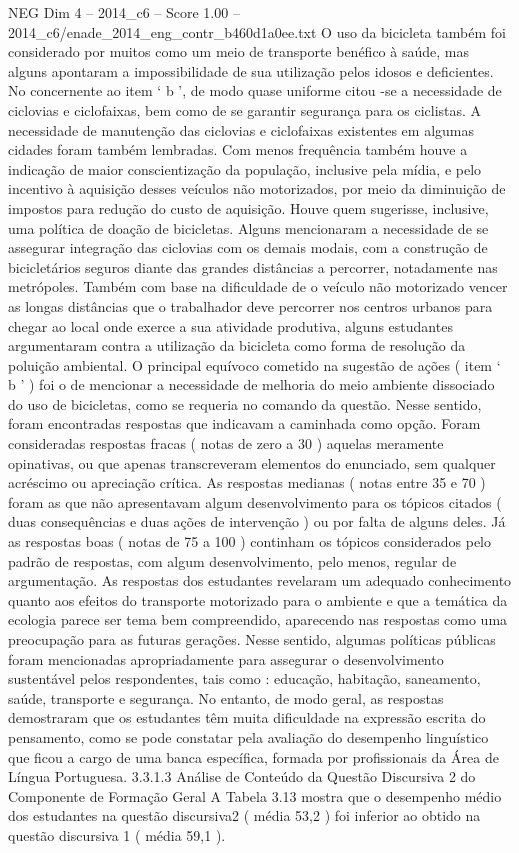 \begin{textsample}{NEG Dim 4 – 2014\_c6 – Score 1.00 – 2014\_c6/enade\_2014\_eng\_contr\_b460d1a0ee.txt}
O uso da bicicleta também foi considerado por muitos como um meio de transporte benéfico à saúde, mas alguns apontaram a impossibilidade de sua utilização pelos idosos e deficientes.
No concernente ao item ‘ b ’, de modo quase uniforme citou -se a necessidade de ciclovias e ciclofaixas, bem como de se garantir segurança para os ciclistas.
A necessidade de manutenção das ciclovias e ciclofaixas existentes em algumas cidades foram também lembradas.
Com menos frequência também houve a indicação de maior conscientização da população, inclusive pela mídia, e pelo incentivo à aquisição desses veículos não motorizados, por meio da diminuição de impostos para redução do custo de aquisição.
Houve quem sugerisse, inclusive, uma política de doação de bicicletas.
Alguns mencionaram a necessidade de se assegurar integração das ciclovias com os demais modais, com a construção de bicicletários seguros diante das grandes distâncias a percorrer, notadamente nas metrópoles.
Também com base na dificuldade de o veículo não motorizado vencer as longas distâncias que o trabalhador deve percorrer nos centros urbanos para chegar ao local onde exerce a sua atividade produtiva, alguns estudantes argumentaram contra a utilização da bicicleta como forma de resolução da poluição ambiental.
O principal equívoco cometido na sugestão de ações ( item ‘ b ’ ) foi o de mencionar a necessidade de melhoria do meio ambiente dissociado do uso de bicicletas, como se requeria no comando da questão.
Nesse sentido, foram encontradas respostas que indicavam a caminhada como opção.
Foram consideradas respostas fracas ( notas de zero a 30 ) aquelas meramente opinativas, ou que apenas transcreveram elementos do enunciado, sem qualquer acréscimo ou apreciação crítica.
As respostas medianas ( notas entre 35 e 70 ) foram as que não apresentavam algum desenvolvimento para os tópicos citados ( duas consequências e duas ações de intervenção ) ou por falta de alguns deles.
Já as respostas boas ( notas de 75 a 100 ) continham os tópicos considerados pelo padrão de respostas, com algum desenvolvimento, pelo menos, regular de argumentação.
As respostas dos estudantes revelaram um adequado conhecimento quanto aos efeitos do transporte motorizado para o ambiente e que a temática da ecologia parece ser tema bem compreendido, aparecendo nas respostas como uma preocupação para as futuras gerações.
Nesse sentido, algumas políticas públicas foram mencionadas apropriadamente para assegurar o desenvolvimento sustentável pelos respondentes, tais como : educação, habitação, saneamento, saúde, transporte e segurança.
No entanto, de modo geral, as respostas demostraram que os estudantes têm muita dificuldade na expressão escrita do pensamento, como se pode constatar pela avaliação do desempenho linguístico que ficou a cargo de uma banca específica, formada por profissionais da Área de Língua Portuguesa. 3.3.1.3 Análise de Conteúdo da Questão Discursiva 2 do Componente de Formação Geral A Tabela 3.13 mostra que o desempenho médio dos estudantes na questão discursiva2 ( média 53,2 ) foi inferior ao obtido na questão discursiva 1 ( média 59,1 ).

\end{textsample}
